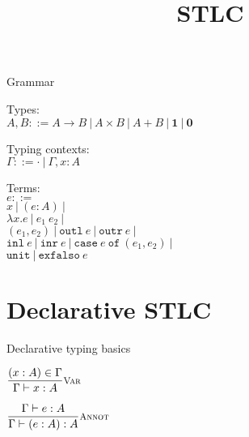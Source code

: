 \documentclass{beamer}
\title{STLC}
\newcommand{\pipe}{\ |\ }
\newcommand{\Fun}[2]{#1 \to #2}
\newcommand{\Prod}[2]{#1 \times #2}
\newcommand{\Sum}[2]{#1 + #2}
\newcommand{\Unit}{\textbf{1}}
\newcommand{\Empty}{\textbf{0}}
\newcommand{\annot}[2]{(#1 : #2)}
\newcommand{\fun}[2]{\lambda #1. #2}
\newcommand{\app}[2]{#1\ #2}
\newcommand{\pair}[2]{(#1, #2)}
\newcommand{\outl}[1][]{\texttt{outl}\ #1}
\newcommand{\outr}[1][]{\texttt{outr}\ #1}
\newcommand{\inl}[1][]{\texttt{inl}\ #1}
\newcommand{\inr}[1][]{\texttt{inr}\ #1}
\newcommand{\case}[3]{\texttt{case}\ #1\ \texttt{of}\ (#2, #3)}
\newcommand{\unit}{\texttt{unit}}
\newcommand{\elimEmpty}[1][]{\texttt{exfalso}\ #1}
\newcommand{\fulltyping}[3]{#1 \vdash #2 : #3}
\newcommand{\typing}[2]{\fulltyping{\Gamma}{#1}{#2}}
\newcommand{\infrule}[3][]{\displaystyle \frac{#2}{#3} \textsc{\footnotesize{#1}}}
\newcommand{\emptytypingctx}{\cdot}
\newcommand{\extend}[3]{#1, #2 : #3}
\newcommand{\sidecond}[1]{#1}
\begin{document}
\begin{frame}{Grammar}

Types: \\
$A, B ::= \Fun{A}{B} \pipe \Prod{A}{B} \pipe \Sum{A}{B} \pipe \Unit \pipe \Empty$

\vspace{2em}

Typing contexts: \\
$\Gamma ::= \emptytypingctx \pipe \extend{\Gamma}{x}{A}$

\vspace{2em}

Terms: \\
$e ::=$ \\
\qquad $x \pipe \annot{e}{A} \pipe$ \\
\qquad $\fun{x}{e} \pipe \app{e_1}{e_2} \pipe$ \\
\qquad $\pair{e_1}{e_2} \pipe \outl[e] \pipe \outr[e] \pipe$ \\
\qquad $\inl[e] \pipe \inr[e] \pipe \case{e}{e_1}{e_2} \pipe$ \\
\qquad $\unit \pipe \elimEmpty{e}$

\vspace{2em}

\end{frame}

\section{Declarative STLC}

\begin{frame}{Declarative typing basics}

\begin{center}
  $\infrule[Var]{\sidecond{(x : A) \in \Gamma}}{\typing{x}{A}}$

  \vspace{2em}

  $\infrule[Annot]{\typing{e}{A}}{\typing{\annot{e}{A}}{A}}$
\end{center}

\end{frame}
\end{document}
